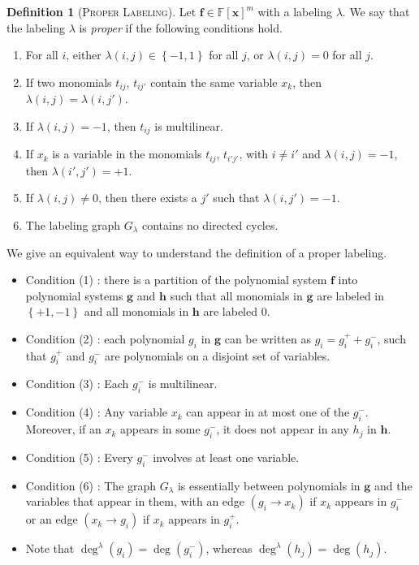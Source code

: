 \documentclass[10pt,a4paper]{article}
\theoremstyle{definition}
\newtheorem{definition}[theorem]{Definition}
\theoremstyle{remark}
\def\set#1{\left\{#1\right\}}
\newcommand{\bbF}{\ensuremath{\mathbb{F}}}
\newcommand{\vecf}{\ensuremath{\boldsymbol{f}}}
\newcommand{\vecg}{\ensuremath{\boldsymbol{g}}}
\newcommand{\vech}{\ensuremath{\boldsymbol{h}}}
\newcommand{\vecx}{\ensuremath{\boldsymbol{x}}}
\begin{document}
\begin{definition}[\textsc{Proper Labeling}] \label{def:properLabel}
  Let $\vecf \in \bbF[\vecx]^m$ with a labeling $\lambda$.
    We say that the labeling $\lambda$ is \textit{proper} if the following
  conditions hold.\\[-6mm]
  \begin{enumerate}
    \item[(1)] For all $i$, either $\lambda(i, j) \in \set{-1, 1}$ for all $j$, or $\lambda(i, j) = 0$ for all $j$.
    \item[(2)] If two monomials $t_{i j}$, $t_{i j'}$ contain the same
          variable $x_k$, then $\lambda(i, j) = \lambda(i, j')$.
    \item[(3)] If $\lambda(i, j) = -1$, then $t_{i j}$ is multilinear.
    \item[(4)] If $x_k$ is a variable in the monomials
          $t_{i j}$, $t_{i' j'}$,
          with $i \neq i'$ and $\lambda(i, j) = -1$, then
          $\lambda(i', j') = +1$.
    \item[(5)] If $\lambda(i, j) \neq 0$, then there exists a $j'$ such that
          $\lambda(i, j') = -1$.
    \item[(6)] The labeling graph $G_{\lambda}$ contains no directed cycles.
  \end{enumerate}
\end{definition}

\noindent We give an equivalent way to understand the definition of a proper labeling.
\begin{itemize}[label=$\triangleright$]
\item Condition (1) : there is a partition of the polynomial system $\vecf$ into polynomial systems $\vecg$ and $\vech$ such that all monomials in $\vecg$ are labeled in $\set{+1, -1}$ and all monomials in $\vech$ are labeled $0$.
\item Condition (2) : each polynomial $g_i$ in $\vecg$ can be written as $g_i = g_i^+ + g_i^{-}$, such that $g_i^+$ and $g_i^-$ are polynomials on a disjoint set of variables.
\item Condition (3) : Each $g_i^-$ is multilinear.
\item Condition (4) : Any variable $x_k$ can appear in at most one of the $g_i^-$. Moreover, if an $x_k$ appears in some $g_i^-$, it does not appear in any $h_j$ in $\vech$.
\item Condition (5) : Every $g_i^-$ involves at least one variable.
\item Condition (6) : The graph $G_{\lambda}$ is essentially between polynomials in $\vecg$ and the variables that appear in them, with an edge $(g_i \to x_k)$ if $x_k$ appears in $g_i^-$ or an edge $(x_k \to g_i)$ if $x_k$ appears in $g_i^+$.
\item Note that $\deg^\lambda(g_i) = \deg(g_i^-)$, whereas $\deg^\lambda(h_j) = \deg(h_j)$.
\end{itemize}
\end{document}
